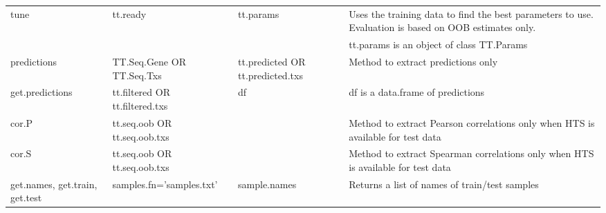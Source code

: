 \documentclass[a4paper,12pt]{article}
\begin{document}
\begin{table}[H]
\begin{tabular}{|p{2.5cm}|p{4cm}|p{4cm}|p{5cm}|}
\hline
tune & tt.ready & tt.params & Uses the training data to find the best parameters to use. Evaluation is based on OOB estimates only. \\
 & & & tt.params is an object of class TT.Params \\
\hline
predictions & TT.Seq.Gene OR TT.Seq.Txs & tt.predicted OR tt.predicted.txs & Method to extract predictions only \\
\hline
get.predictions & tt.filtered OR tt.filtered.txs & df & df is a data.frame of predictions \\
\hline
cor.P & tt.seq.oob OR tt.seq.oob.txs &  & Method to extract Pearson correlations only when HTS is available for test data \\
\hline
cor.S & tt.seq.oob OR tt.seq.oob.txs &  & Method to extract Spearman correlations only when HTS is available for test data \\
\hline
get.names, get.train, get.test & samples.fn='samples.txt' & sample.names & Returns a list of names of train/test samples \\
\hline
\end{tabular}
\end{table}
\end{document}
